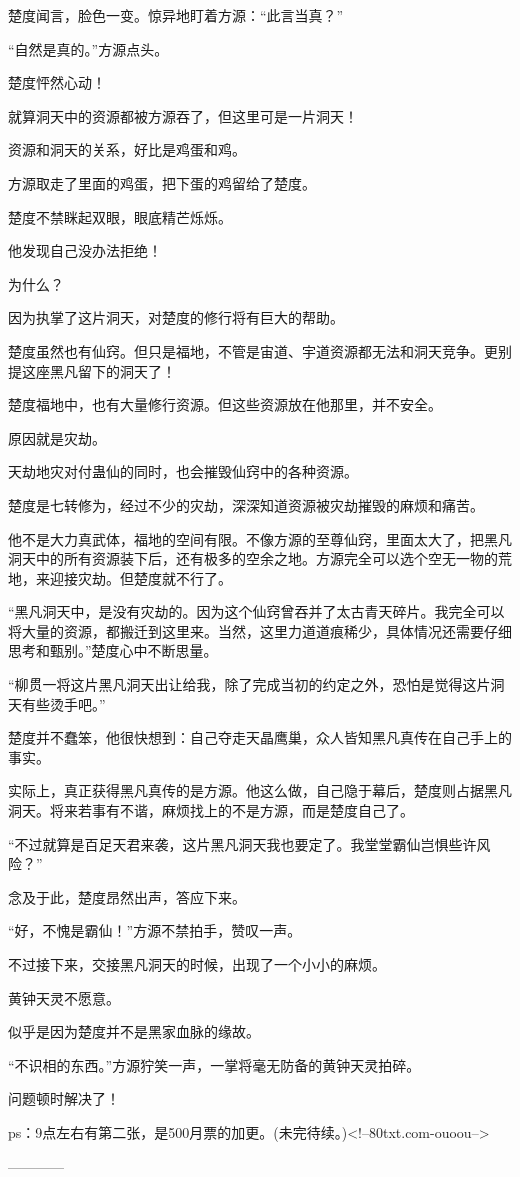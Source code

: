 \begin{this_body}
楚度闻言，脸色一变。惊异地盯着方源：“此言当真？”

“自然是真的。”方源点头。

楚度怦然心动！

就算洞天中的资源都被方源吞了，但这里可是一片洞天！

资源和洞天的关系，好比是鸡蛋和鸡。

方源取走了里面的鸡蛋，把下蛋的鸡留给了楚度。

楚度不禁眯起双眼，眼底精芒烁烁。

他发现自己没办法拒绝！

为什么？

因为执掌了这片洞天，对楚度的修行将有巨大的帮助。

楚度虽然也有仙窍。但只是福地，不管是宙道、宇道资源都无法和洞天竞争。更别提这座黑凡留下的洞天了！

楚度福地中，也有大量修行资源。但这些资源放在他那里，并不安全。

原因就是灾劫。

天劫地灾对付蛊仙的同时，也会摧毁仙窍中的各种资源。

楚度是七转修为，经过不少的灾劫，深深知道资源被灾劫摧毁的麻烦和痛苦。

他不是大力真武体，福地的空间有限。不像方源的至尊仙窍，里面太大了，把黑凡洞天中的所有资源装下后，还有极多的空余之地。方源完全可以选个空无一物的荒地，来迎接灾劫。但楚度就不行了。

“黑凡洞天中，是没有灾劫的。因为这个仙窍曾吞并了太古青天碎片。我完全可以将大量的资源，都搬迁到这里来。当然，这里力道道痕稀少，具体情况还需要仔细思考和甄别。”楚度心中不断思量。

“柳贯一将这片黑凡洞天出让给我，除了完成当初的约定之外，恐怕是觉得这片洞天有些烫手吧。”

楚度并不蠢笨，他很快想到：自己夺走天晶鹰巢，众人皆知黑凡真传在自己手上的事实。

实际上，真正获得黑凡真传的是方源。他这么做，自己隐于幕后，楚度则占据黑凡洞天。将来若事有不谐，麻烦找上的不是方源，而是楚度自己了。

“不过就算是百足天君来袭，这片黑凡洞天我也要定了。我堂堂霸仙岂惧些许风险？”

念及于此，楚度昂然出声，答应下来。

“好，不愧是霸仙！”方源不禁拍手，赞叹一声。

不过接下来，交接黑凡洞天的时候，出现了一个小小的麻烦。

黄钟天灵不愿意。

似乎是因为楚度并不是黑家血脉的缘故。

“不识相的东西。”方源狞笑一声，一掌将毫无防备的黄钟天灵拍碎。

问题顿时解决了！

ps：9点左右有第二张，是500月票的加更。(未完待续。)<!--80txt.com-ouoou-->

------------

\end{this_body}

